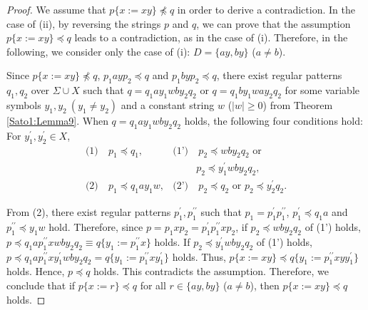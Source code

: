 \begin{proof}
We assume that $p \{ x := xy \} \not \preceq q$ in order to derive a contradiction.
In the case of \textrm{(ii)}, by reversing the strings $p$ and $q$, we can prove that the assumption $p \{ x := xy \} \preceq q$ leads to a contradiction, as in the case of \textrm{(i)}.
Therefore, in the following, we consider only the case of \textrm{(i)}: $D=\{ ay, by \}$ ($a \not= b$).

Since $p \{ x := xy \} \not \preceq q$, $p_{1}ayp_{2}\preceq q$ and $p_{1}byp_{2}\preceq q$, 
there exist regular patterns $q_{1},q_{2}$ {\color{red}over} $\Sigma\cup X$ such that $q=q_{1}ay_{1}wby_{2}q_{2}$ or $q=q_{1}by_{1}way_{2}q_{2}$ for some variable symbols $y_{1},y_{2}~(y_{1} \not= y_{2})$ and a constant string $w$ ($|w|\geq 0$) from Theorem \ref{Sato1:Lemma9}.
When $q=q_{1}ay_{1}wby_{2}q_{2}$ holds, the following four conditions hold: For $y_{1}^{\prime}, y_{2}^{\prime}\in X$,
\begin{align*}
\textrm{(1)} & ~p_{1} \preceq q_{1}, & \textrm{(1')} & ~p_{2} \preceq wby_{2}q_{2} \mbox{~or~}\\
& & & p_{2} \preceq y_{1}^{\prime}wby_{2}q_{2},\\
\textrm{(2)} & ~p_{1} \preceq q_{1}ay_{1}w, & \textrm{(2')} & ~p_{2} \preceq q_{2} \mbox{~or~}
p_{2} \preceq y_{2}^{\prime}q_{2}.
\end{align*}

From (2), there exist regular patterns $p_{1}^{\prime},p_{1}^{\prime\prime}$ such that $p_{1}=p_{1}^{\prime}p_{1}^{\prime\prime}$, $p_{1}^{\prime} \preceq q_{1}a$ and $p_{1}^{\prime\prime} \preceq y_{1}w$ hold.
Therefore, since $p=p_{1}xp_{2}=p_{1}^{\prime}p_{1}^{\prime\prime}xp_{2}$,
if $p_{2} \preceq wby_{2}q_{2}$ of (1') holds, 
$p\preceq q_{1}ap_{1}^{\prime\prime}xwby_{2}q_{2}\equiv q \{ y_{1} := p_{1}^{\prime\prime}x \}$ holds.
If $p_2\preceq y_{1}^{\prime}wby_{2}q_{2}$ of (1') holds, $p\preceq q_{1}ap_{1}^{\prime\prime}xy_{1}^{\prime}wby_{2}q_{2}=q \{ y_{1} := p_{1}^{\prime\prime}xy_{1}^{\prime} \}$ holds.
Thus, $p\{x := xy\} \preceq q \{ y_{1} := p_{1}^{\prime\prime}xyy_{1}^{\prime} \}$ holds.
Hence, $p \preceq q$ holds.
This contradicts the assumption.
Therefore, we conclude that if $p \{ x := r \} \preceq q$ for all $r \in \{ ay, by \}$ ($a \not= b$), then $p \{ x := xy \} \preceq q$ holds.
\end{proof}

